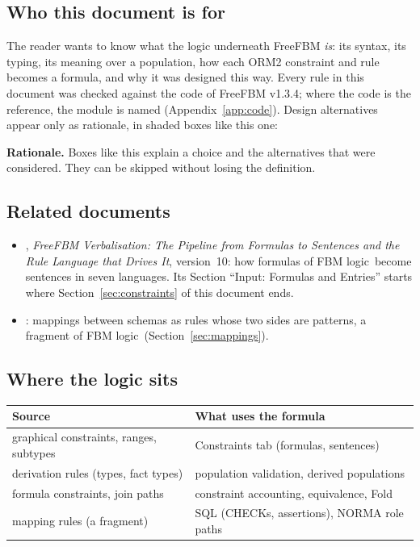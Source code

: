 \documentclass[11pt, a4paper]{article}
\newcommand{\FBM}{FBM logic}
\begin{document}
\subsection{Who this document is for}

The reader wants to know what the logic underneath FreeFBM \emph{is}: its
syntax, its typing, its meaning over a population, how each ORM2 constraint
and rule becomes a formula, and why it was designed this way. Every rule in
this document was checked against the code of FreeFBM v1.3.4; where the code
is the reference, the module is named (Appendix~\ref{app:code}). Design
alternatives appear only as rationale, in shaded boxes like this one:

\begin{rationale}
\textbf{Rationale.} Boxes like this explain a choice and the alternatives
that were considered. They can be skipped without losing the definition.
\end{rationale}

\subsection{Related documents}

\begin{itemize}
  \item {}, \emph{FreeFBM
        Verbalisation: The Pipeline from Formulas to Sentences and the Rule
        Language that Drives It}, version~10: how formulas of \FBM\ become
        sentences in seven languages. Its Section ``Input: Formulas and
        Entries'' starts where Section~\ref{sec:constraints} of this document
        ends.
  \item {}: mappings between schemas as
        rules whose two sides are patterns, a fragment of \FBM\
        (Section~\ref{sec:mappings}).
\end{itemize}

\subsection{Where the logic sits}

\begin{center}
\begin{tabular}{l@{\quad$\longrightarrow$\quad}l}
\toprule
\textbf{Source} & \textbf{What uses the formula} \\
\midrule
graphical constraints, ranges, subtypes & Constraints tab (formulas, sentences) \\
derivation rules (types, fact types)    & population validation, derived populations \\
formula constraints, join paths         & constraint accounting, equivalence, Fold \\
mapping rules (a fragment)              & SQL (CHECKs, assertions), NORMA role paths \\
\bottomrule
\end{tabular}
\end{center}
\end{document}
